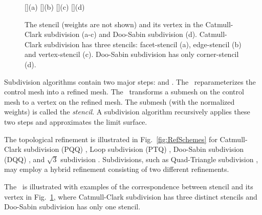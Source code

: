 
\begin{figure}[tb]
  \centering
  []{(a)}
  []{(b)}
  []{(c)}
  []{(d)}
  \caption{The stencil (weights are not shown) and its 
           vertex in the Catmull-Clark subdivision (a-c)
           and Doo-Sabin subdivision (d). Catmull-Clark
           subdivision has three stencils: facet-stencil (a), 
           edge-stencil (b) and vertex-stencil (c). 
           Doo-Sabin subdivision has only corner-stencil (d).}
  \label{fig:RefMap}\vspace*{-4mm}
\end{figure}



Subdivision algorithms \cite{Warren:subdivision, Sub:course:2000} 
contain two major steps: \emph{\tr} and \emph{\gm}.
The \tr\ reparameterizes the control mesh into a refined 
mesh. The \gm\ transforms a submesh on the control mesh
to a vertex on the refined mesh. The submesh (with
the normalized weights) is called the
\emph{stencil}. A subdivision algorithm recursively 
applies these two steps and approximates the limit surface. 

The topological refinement is illustrated 
in Fig.~\ref{fig:RefSchemes} for Catmull-Clark
subdivision (PQQ) \cite{cc}, Loop subdivision (PTQ) \cite{loop},
Doo-Sabin subdivision (DQQ) \cite{ds}, and $\sqrt{3}$ subdivision
\cite{sqrt3}. Subdivisions, such as Quad-Triangle subdivision 
\cite{qts,l-pg-03}, may employ a hybrid refinement consisting
of two different refinements.

The \gm\ is illustrated with examples of the correspondence between
stencil and its vertex in Fig.~\ref{fig:RefMap}, where Catmull-Clark
subdivision has three distinct stencils and Doo-Sabin subdivision has
only one stencil. 

